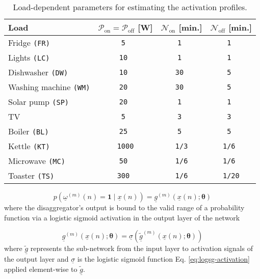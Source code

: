 \documentclass[twocolumn,letter,10pt]{IEEEtran} %
\begin{document}
\setlength{\textfloatsep}{0.1cm}
\begin{table}[!t]
	\centering
	\footnotesize
	\caption{Load-dependent parameters for estimating the activation profiles. }
	\label{tbl:loads}
	\renewcommand{\arraystretch}{0.81}
	\footnotesize
	\begin{tabularx}{88mm}{lccc}
		\toprule
		Load  	 & $\mathcal{P}_{\text{on}} = \mathcal{P}_{\text{off}}$ [W] & $\mathcal{N}_{\text{on}}$ [min.]  & $\mathcal{N}_{\text{off}}$ [min.]\\[1mm]
		\midrule{Fridge \texttt{(FR)}}               & \texttt{5   }    & \texttt{1  }    & \texttt{1   }    \\[1mm]
		{Lights \texttt{(LC)}}               & \texttt{10  }    & \texttt{1  }    & \texttt{1   }    \\[1mm]
		{Dishwasher \texttt{(DW)}}           & \texttt{10  }    & \texttt{30 }    & \texttt{5   }    \\[1mm]
		{Washing machine \texttt{(WM)}}      & \texttt{20  }    & \texttt{30 }    & \texttt{5   }    \\[1mm]
		{Solar  pump \texttt{(SP)}}   		& \texttt{20  }    & \texttt{1  }    & \texttt{1   }    \\[1mm]
		{TV}                                 & \texttt{5   }    & \texttt{3  }    & \texttt{3   }    \\[1mm]
		{Boiler \texttt{(BL)}}               & \texttt{25  }    & \texttt{5  }    & \texttt{5   }    \\[1mm]
		{Kettle \texttt{(KT)}}               & \texttt{1000}    & \texttt{1/3}    & \texttt{1/6 }    \\[1mm]
		{Microwave \texttt{(MC)}}            & \texttt{50  }    & \texttt{1/6}    & \texttt{1/6 }    \\[1mm]
		{Toaster \texttt{(TS)}}              & \texttt{300 }    & \texttt{1/6}    & \texttt{1/20}    \\
		\bottomrule
	\end{tabularx}
\end{table}


{\small\begin{equation}
	p\left(\underline{\omega}^{(m)}(n)=\bm{1}\;\big|\;\underline{x}(n)\right) = \underline{g}^{(m)}\left(\underline{x}(n); \bm{\theta}\right)
	\end{equation}}%
where the disaggregator's output is bound to the valid range of a probability function via a logistic sigmoid activation in the output layer of the network

{\small\begin{equation}
	\underline{g}^{(m)}\left(\underline{x}(n); \bm{\theta}\right) = \underline{\sigma}\left(\underline{\tilde{g}}^{(m)}\left(\underline{x}(n); \bm{\theta}\right)\right)
	\end{equation}}%
where $\underline{\tilde{g}}$ represents the sub-network from the input layer to activation signals of the output layer and $\underline{\sigma}$ is the logistic sigmoid function Eq. \ref{eq:logsg-activation} applied element-wise to $\underline{\tilde{g}}$.
\end{document}
